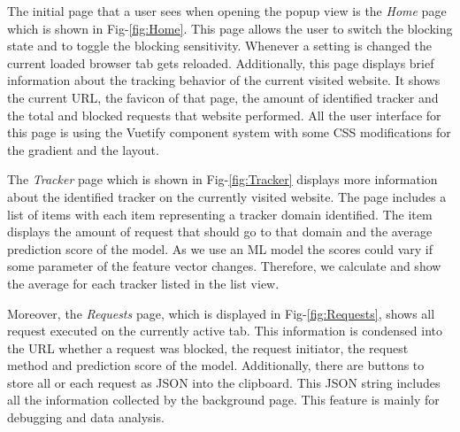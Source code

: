 The initial page that a user sees when opening the popup view is the \emph{Home} page which is shown in Fig-\ref{fig:Home}. This page
allows the user to switch the blocking state and to toggle the blocking sensitivity. Whenever a setting is changed the current loaded
browser tab gets reloaded. Additionally, this page displays brief information about the tracking behavior of the current visited website.
It shows the current URL, the favicon of that page, the amount of identified tracker and the total and blocked requests that website performed. 
All the user interface for this page is using the Vuetify component system with some CSS modifications for the gradient and the layout.

The \emph{Tracker} page which is shown in Fig-\ref{fig:Tracker} displays more information about the identified tracker on the currently
visited website. The page includes a list of items with each item representing a tracker domain identified. The item displays the amount of
request that should go to that domain and the average prediction score of the model. As we use an ML model the scores could vary if some parameter
of the feature vector changes. Therefore, we calculate and show the average for each tracker listed in the list view.

Moreover, the \emph{Requests} page, which is displayed in Fig-\ref{fig:Requests}, shows all request executed on the currently active tab. This information is condensed into the URL 
whether a request was blocked, the request initiator, the request method and prediction score of the model. Additionally, there are buttons to store all or each request as JSON into the clipboard.
This JSON string includes all the information collected by the background page. This feature is mainly for debugging and data analysis.

